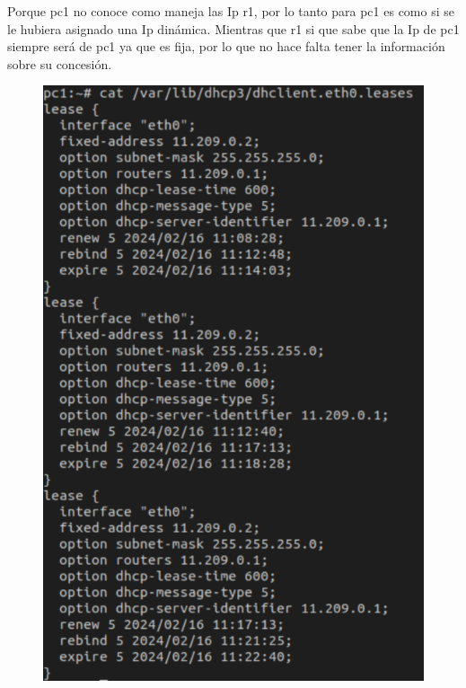 \documentclass[12pt, a4paper]{report}
\begin{document}
\begin{enumerate}
	Porque pc1 no conoce como maneja las Ip r1, por lo tanto para pc1 es como si se le hubiera asignado una Ip dinámica. Mientras que r1 si que sabe que la Ip de pc1 siempre será de pc1 ya que es fija, por lo que no hace falta tener la información sobre su concesión.
	\begin{figure}[H] %
		\begin{minipage}[t]{.45\linewidth}
			\includegraphics[width=\linewidth]{ej2_1_3}
		\end{minipage}\hfill
		\begin{minipage}[b]{.45\linewidth}

\end{minipage}
\end{figure}
\end{enumerate}
\end{document}
